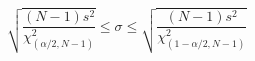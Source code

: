 

\[
\sqrt{\frac{(N - 1) s^{2}} {\chi^{2}_{(\alpha/2,N-1)}} } \leq \sigma \leq \sqrt{\frac{(N - 1) s^{2}} {\chi^{2}_{(1-\alpha/2,N-1)}} }

\]


